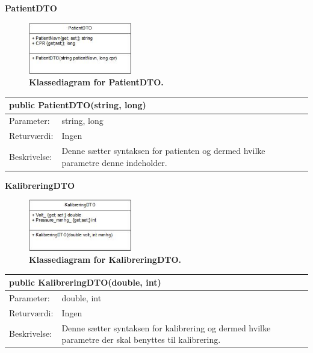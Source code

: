 \textbf{PatientDTO}
\begin{figure}[H]
\includegraphics[width =0.4\textwidth , center]{billeder/klassediagrampatientDTO}
\caption{\textbf{Klassediagram for PatientDTO.}}
\end{figure}
\begin{table}[H]
\label{tab:tabel2}
\begin{tabular}{| l | p{13cm} |}
   \hline
   \multicolumn{2}{|l|}{public PatientDTO(string, long)} \\ \hline
   Parameter: & string, long\\ \hline
   Returværdi: & Ingen \\ \hline
   Beskrivelse: & Denne sætter syntaksen for patienten og dermed hvilke parametre denne indeholder.\\ \hline
\end{tabular}
\end{table}

\textbf{KalibreringDTO}
\begin{figure}[H]
\includegraphics[width =0.4\textwidth , center]{billeder/klassediagramkalibreringDTO}
\caption{\textbf{Klassediagram for KalibreringDTO.}}
\end{figure}
\begin{table}[H]
\label{tab:tabel2}
\begin{tabular}{| l | p{13cm} |}
   \hline
   \multicolumn{2}{|l|}{public KalibreringDTO(double, int)} \\ \hline
   Parameter: & double, int\\ \hline
   Returværdi: & Ingen \\ \hline
   Beskrivelse: & Denne sætter syntaksen for kalibrering og dermed hvilke parametre der skal benyttes til kalibrering.\\ \hline
\end{tabular}
\end{table}

